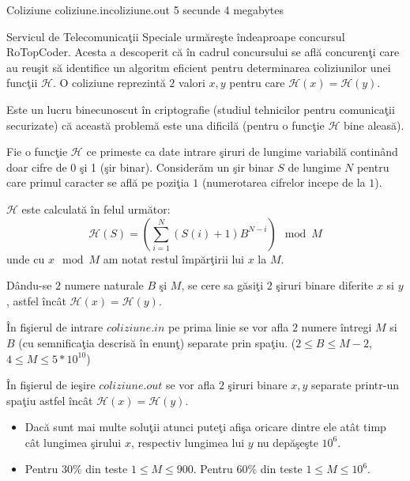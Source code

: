 \begin{problem}{Coliziune}
{coliziune.in}{coliziune.out}
{5 secunde} {4 megabytes}{}

Servicul de Telecomunica\c{t}ii Speciale urm\u{a}re\c{s}te \^{i}ndeaproape concursul RoTopCoder. Acesta a descoperit c\u{a} \^{i}n cadrul concursului se afl\u{a} concuren\c{t}i care au reu\c{s}it s\u{a} identifice un algoritm eficient pentru determinarea coliziunilor unei func\c{t}ii $\mathcal{H}$.
O coliziune reprezint\u{a} $2$ valori $x, y$ pentru care $\mathcal{H}(x) = \mathcal{H}(y)$.

Este un lucru binecunoscut \^{i}n criptografie (studiul tehnicilor pentru comunica\c{t}ii securizate) c\u{a} aceast\u{a} problem\u{a} este una dificil\u{a} (pentru o func\c{t}ie $\mathcal{H}$ bine aleas\u{a}).

Fie o func\c{t}ie $\mathcal{H}$ ce primeste ca date intrare \c{s}iruri de lungime variabil\u{a} contin\^{a}nd doar cifre de 0 \c{s}i 1 (\c{s}ir binar). Consider\u{a}m un \c{s}ir binar $S$ de lungime $N$ pentru care primul caracter se afl\u{a} pe pozi\c{t}ia $1$ (numerotarea cifrelor incepe de la $1$).

$\mathcal{H}$ este calculat\u{a} \^{i}n felul urm\u{a}tor:
\begin{equation}
\mathcal{H}(S) = (\displaystyle\sum_{i = 1}^{N}{(S(i) + 1) B ^{N - i}}) \mod M
\end{equation}
unde cu $x \mod M$ am notat restul \^{i}mp\u{a}r\c{t}irii lui $x$ la $M$.

D\^{a}ndu-se $2$ numere naturale $B$ \c{s}i $M$, se cere sa g\u{a}si\c{t}i $2$ \c{s}iruri binare diferite $x$ si $y$, astfel \^{i}nc\^{a}t $\mathcal{H}(x) = \mathcal{H}(y)$.

\InputFile

\^{I}n fi\c{s}ierul de intrare $coliziune.in$ pe prima linie se vor afla $2$ numere întregi $M$ si $B$ (cu semnifica\c{t}ia descris\u{a} \^{i}n enun\c{t}) separate prin spa\c{t}iu. ($2 \le B \le M-2$, $4 \le M \le 5 * 10^{10}$)

\OutputFile

În fişierul de ie\c{s}ire $coliziune.out$ se vor afla $2$ \c{s}iruri binare $x, y$ separate printr-un spa\c{t}iu astfel \^{i}nc\^a{t} $\mathcal{H}(x) = \mathcal{H}(y)$.

\Notes
\begin{itemize}
	\setlength{\itemsep}{1pt}
  	\setlength{\parskip}{0pt}
  	\setlength{\parsep}{0pt}
	\item Dac\u{a} sunt mai multe solu\c{t}ii atunci pute\c{t}i afi\c{s}a oricare dintre ele at\^{a}t timp c\^{a}t lungimea \c{s}irului $x$, respectiv lungimea lui $y$ nu dep\u{a}\c{s}e\c{s}te $10^6$.
	\item Pentru $30 \%$ din teste $1 \le M \le 900$. Pentru $60 \%$ din teste $1 \le M \le 10^6$.
\end{itemize}


\end{problem}
